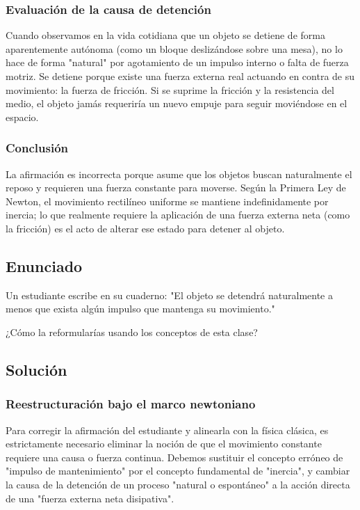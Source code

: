 \documentclass[12pt, a4paper]{article}
\begin{document}
\subsubsection*{Evaluación de la causa de detención}
Cuando observamos en la vida cotidiana que un objeto se detiene de forma aparentemente autónoma (como un bloque deslizándose sobre una mesa), no lo hace de forma "natural" por agotamiento de un impulso interno o falta de fuerza motriz. Se detiene porque existe una fuerza externa real actuando en contra de su movimiento: la fuerza de fricción. Si se suprime la fricción y la resistencia del medio, el objeto jamás requeriría un nuevo empuje para seguir moviéndose en el espacio.

\subsubsection*{Conclusión}
La afirmación es incorrecta porque asume que los objetos buscan naturalmente el reposo y requieren una fuerza constante para moverse. Según la Primera Ley de Newton, el movimiento rectilíneo uniforme se mantiene indefinidamente por inercia; lo que realmente requiere la aplicación de una fuerza externa neta (como la fricción) es el acto de alterar ese estado para detener al objeto.

\newpage

\subsection*{Enunciado}

Un estudiante escribe en su cuaderno: "El objeto se detendrá naturalmente a menos que exista algún impulso que mantenga su movimiento."

¿Cómo la reformularías usando los conceptos de esta clase?

\subsection*{Solución}

\subsubsection*{Reestructuración bajo el marco newtoniano}
Para corregir la afirmación del estudiante y alinearla con la física clásica, es estrictamente necesario eliminar la noción de que el movimiento constante requiere una causa o fuerza continua. Debemos sustituir el concepto erróneo de "impulso de mantenimiento" por el concepto fundamental de "inercia", y cambiar la causa de la detención de un proceso "natural o espontáneo" a la acción directa de una "fuerza externa neta disipativa".
\end{document}
